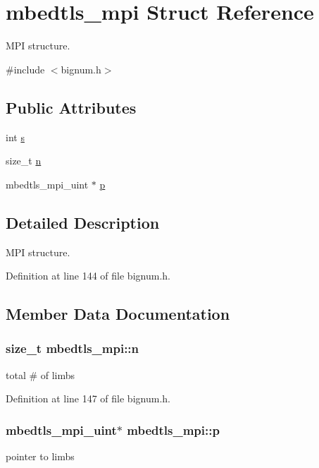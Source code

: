 \hypertarget{structmbedtls__mpi}{\section{mbedtls\-\_\-mpi Struct Reference}
\label{structmbedtls__mpi}
}


M\-P\-I structure.  




{\ttfamily \#include $<$bignum.\-h$>$}

\subsection*{Public Attributes}
\begin{DoxyCompactItemize}
\item 
int \hyperlink{structmbedtls__mpi_a98e0b295f053643085b1c756857c3477}{s}
\item 
size\-\_\-t \hyperlink{structmbedtls__mpi_a09fab4ba4d22d47ecf987e9cf2dccf13}{n}
\item 
mbedtls\-\_\-mpi\-\_\-uint $\ast$ \hyperlink{structmbedtls__mpi_af0af10ca10e97e8bce41da588600836e}{p}
\end{DoxyCompactItemize}


\subsection{Detailed Description}
M\-P\-I structure. 

Definition at line 144 of file bignum.\-h.



\subsection{Member Data Documentation}
\hypertarget{structmbedtls__mpi_a09fab4ba4d22d47ecf987e9cf2dccf13}{
\subsubsection[{n}]{\setlength{\rightskip}{0pt plus 5cm}size\-\_\-t mbedtls\-\_\-mpi\-::n}}\label{structmbedtls__mpi_a09fab4ba4d22d47ecf987e9cf2dccf13}
total \# of limbs 

Definition at line 147 of file bignum.\-h.

\hypertarget{structmbedtls__mpi_af0af10ca10e97e8bce41da588600836e}{
\subsubsection[{p}]{\setlength{\rightskip}{0pt plus 5cm}mbedtls\-\_\-mpi\-\_\-uint$\ast$ mbedtls\-\_\-mpi\-::p}}\label{structmbedtls__mpi_af0af10ca10e97e8bce41da588600836e}
pointer to limbs 

